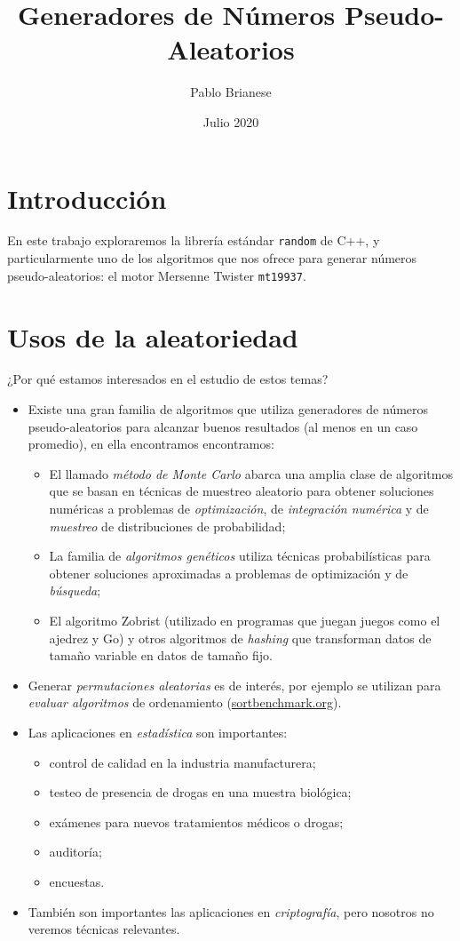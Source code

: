 \documentclass{article}
\title{Generadores de Números Pseudo-Aleatorios}
\author{Pablo Brianese}
\date{Julio 2020}
\begin{document}
\maketitle

\section{Introducción}
En este trabajo exploraremos la librería estándar \verb#random# de C++, y particularmente uno de los algoritmos que nos ofrece para generar números pseudo-aleatorios: el motor Mersenne Twister \verb#mt19937#. 

\section{Usos de la aleatoriedad}
¿Por qué estamos interesados en el estudio de estos temas?

\begin{itemize}
    \item Existe una gran familia de algoritmos que utiliza generadores de números pseudo-aleatorios para alcanzar buenos resultados (al menos en un caso promedio), en ella encontramos encontramos:
    \begin{itemize}
        \item El llamado \emph{método de Monte Carlo} abarca una amplia clase de algoritmos que se basan en técnicas de muestreo aleatorio para obtener soluciones numéricas a problemas de \emph{optimización}, de \emph{integración numérica} y de \emph{muestreo} de distribuciones de probabilidad;
        \item La familia de \emph{algoritmos genéticos} utiliza técnicas probabilísticas para obtener soluciones aproximadas a problemas de optimización y de \emph{búsqueda};
        \item El algoritmo Zobrist (utilizado en programas que juegan juegos como el ajedrez y Go) y otros algoritmos de \emph{hashing} que transforman datos de tamaño variable en datos de tamaño fijo.
    \end{itemize}
    \item Generar \emph{permutaciones aleatorias} es de interés, por ejemplo se utilizan para \emph{evaluar algoritmos} de ordenamiento (\url{sortbenchmark.org}).
    \item Las aplicaciones en \emph{estadística} son importantes:
    \begin{itemize}
        \item control de calidad en la industria manufacturera;
        \item testeo de presencia de drogas en una muestra biológica;
        \item exámenes para nuevos tratamientos médicos o drogas;
        \item auditoría;
        \item encuestas.
    \end{itemize}
    \item También son importantes las aplicaciones en \emph{criptografía}, pero nosotros no veremos técnicas relevantes.
\end{itemize}
\end{document}
